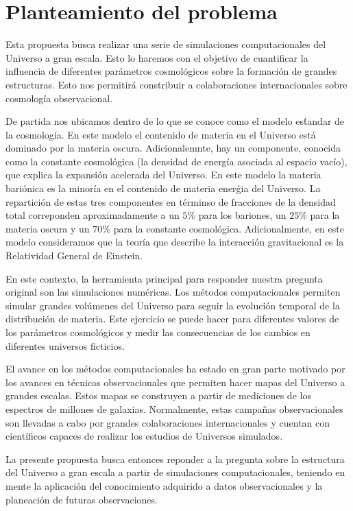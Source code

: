

\section{Planteamiento del problema}

Esta propuesta busca realizar una serie de simulaciones
computacionales del Universo a gran escala. Esto lo haremos con el
objetivo de cuantificar la influencia de diferentes par\'ametros
cosmol\'ogicos sobre la formaci\'on de grandes estructuras. Esto nos
permitir\'a constribuir a colaboraciones internacionales sobre
cosmolog\'ia observacional. 

De partida nos ubicamos dentro de lo que se conoce como el modelo
es\'tandar de la cosmolog\'ia. En este modelo el contenido de materia
en el Universo est\'a dominado por la materia oscura. Adicionalemnte,
hay un componente, conocida como la constante cosmol\'ogica (la
densidad de energ\'ia asociada al espacio vac\'io), que explica la
expansi\'on acelerada del Universo. En este modelo la materia
bari\'onica es la minor\'ia en el contenido de materia ener\'gia del
Universo. La repartici\'on de estas tres componentes en t\'erminso de
fracciones de la densidad total correponden aproximadamente a un $5\%$
para los bariones, un $25\%$ para la materia oscura y un $70\%$ para
la constante cosmol\'ogica. Adicionalmente, en este modelo
consideramos que la teor\'ia que describe la interacci\'on
gravitacional es la Relatividad General de Einstein.

En este contexto, la herramienta principal para responder nuestra
pregunta original son las simulaciones num\'ericas. Los 
m\'etodos computacionales permiten simular grandes
vol\'umenes del Universo para seguir la evoluci\'on temporal de la
distribuci\'on de materia. Este ejercicio se puede hacer para
diferentes valores de los par\'ametros cosmol\'ogicos y 
medir las consecuencias de los cambios en diferentes universos
ficticios.  

El avance en los m\'etodos computacionales ha estado en gran parte
motivado por los avances en t\'ecnicas observacionales que permiten
hacer mapas del Universo a grandes escalas. Estos mapas se construyen
a partir de mediciones de los espectros de millones de
galaxias. Normalmente, estas campa\~nas observacionales son llevadas a
cabo por grandes colaboraciones internacionales y cuentan  con
cient\'ificos capaces de realizar los estudios de Universos simulados.

La presente propuesta busca entonces reponder a la pregunta sobre la
estructura del Universo a gran escala a partir de simulaciones
computacionales, teniendo en mente la aplicaci\'on del conocimiento
adquirido a datos observacionales y la planeaci\'on de futuras
observaciones.
